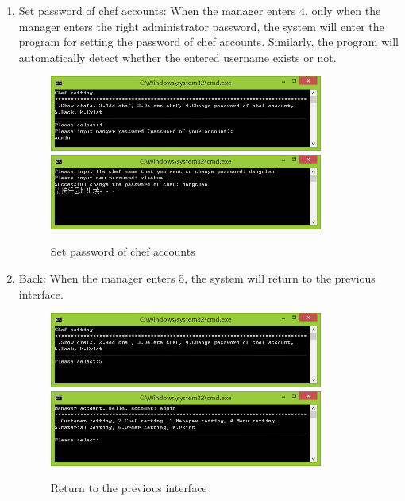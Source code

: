 \documentclass{article}
\begin{document}
\begin{enumerate}
    \item Set password of chef accounts:\newline 
    When the manager enters 4, only when the manager enters the right administrator password, the system will enter the program for setting the password of chef accounts. Similarly, the program will automatically detect whether the entered username exists or not.
        \begin{figure}[H]
        \centering
        \includegraphics[width=0.85\textwidth]{B/B4b1.jpg}
        \includegraphics[width=0.85\textwidth]{B/B4b3.jpg}
        \caption{Set password of chef accounts}
        \end{figure}
    
    \item Back:\newline 
    When the manager enters 5, the system will return to the previous interface.
        \begin{figure}[H]
        \centering
        \includegraphics[width=0.85\textwidth]{B/B5a.jpg}
        \includegraphics[width=0.85\textwidth]{B/B5b.jpg}
        \caption{Return to the previous interface}
        \end{figure}
    

\end{enumerate}
\end{document}
